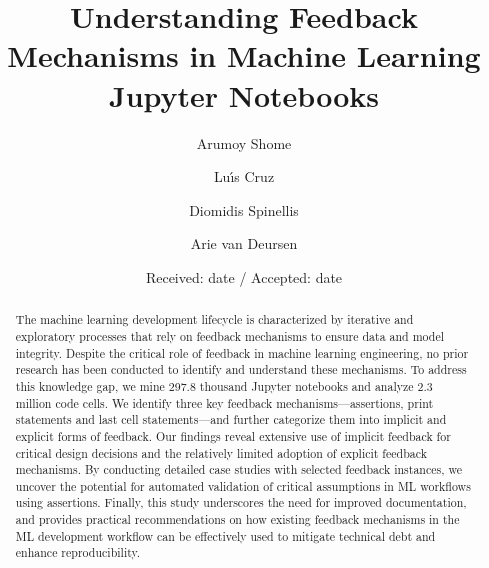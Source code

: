 \documentclass[smallextended]{svjour3}       %
\begin{document}
\title{Understanding Feedback Mechanisms in Machine Learning Jupyter Notebooks}


\author{Arumoy Shome\and
	Lu{\'\i}s Cruz\and
	Diomidis Spinellis\and
	Arie van Deursen
}



\date{Received: date / Accepted: date}


\maketitle

\begin{abstract}
	The machine learning development lifecycle is characterized by iterative and exploratory processes that rely on feedback mechanisms to ensure data and model integrity. Despite the critical role of feedback in machine learning engineering, no prior research has been conducted to identify and understand these mechanisms. To address this knowledge gap, we mine 297.8 thousand Jupyter notebooks and analyze 2.3 million code cells. We identify three key feedback mechanisms---assertions, print statements and last cell statements---and further categorize them into implicit and explicit forms of feedback. Our findings reveal extensive use of implicit feedback for critical design decisions and the relatively limited adoption of explicit feedback mechanisms. By conducting detailed case studies with selected feedback instances, we uncover the potential for automated validation of critical assumptions in ML workflows using assertions. Finally, this study underscores the need for improved documentation, and provides practical recommendations on how existing feedback mechanisms in the ML development workflow can be effectively used to mitigate technical debt and enhance reproducibility.
\end{abstract}
\end{document}
